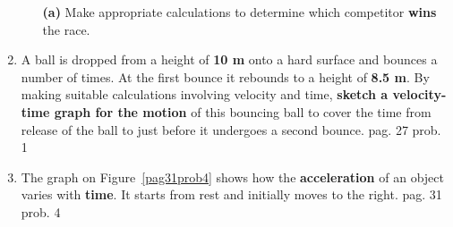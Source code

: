 \documentclass[A4,12pt]{article}
\begin{document}
\begin{enumerate}[label=\bfseries (\arabic*)]
\begin{itemize}
    \item[\bf (a)] Make appropriate calculations to determine which competitor {\bf wins} the race.
\end{itemize}
%
%
%
%
%
%
%
%
%
%
%
%
%
%
%
%
%
%
%
%
%
%
%
%
%
%
%
%
%
%
%
%
%
%
%
%
%
%
%
%
%
%
%
%
%
%
%
%
\item A ball is dropped from a height of {\bf 10 m} onto a hard surface and bounces a number of
times. At the first bounce it rebounds to a height of {\bf 8.5 m}. By making suitable calculations involving velocity and time, {\bf sketch a velocity-time graph for the motion} of this bouncing ball to cover the time from release of the ball to just before it undergoes a second bounce. \cite{ASCCEA} pag. 27 prob. 1\\
%
%
%
%
%
%
%
%
%
%
%
%
%
%
%
%
\item The graph on Figure~\ref{pag31prob4} shows how the {\bf acceleration} of an object varies with {\bf time}. It starts from rest and initially moves to the right. \cite{ASCCEA} pag. 31 prob. 4

\end{enumerate}
\end{document}
